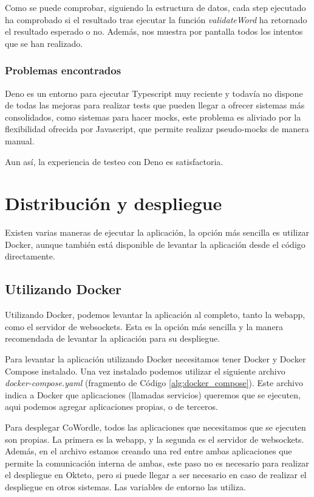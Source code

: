 Como se puede comprobar, siguiendo la estructura de datos, cada step ejecutado ha comprobado si el resultado tras ejecutar la función \textit{validateWord} ha retornado el resultado esperado o no. Además, nos muestra por pantalla todos los intentos que se han realizado.

\subsubsection{Problemas encontrados}
Deno es un entorno para ejecutar Typescript muy reciente y todavía no dispone de todas las mejoras para realizar tests que pueden llegar a ofrecer sistemas más consolidados, como sistemas para hacer mocks, este problema es aliviado por la flexibilidad ofrecida por Javascript, que permite realizar pseudo-mocks de manera manual.

Aun así, la experiencia de testeo con Deno es satisfactoria.

\section{Distribución y despliegue}

Existen varias maneras de ejecutar la aplicación, la opción más sencilla es utilizar Docker, aunque también está disponible de levantar la aplicación desde el código directamente.

\subsection{Utilizando Docker}
Utilizando Docker, podemos levantar la aplicación al completo, tanto la webapp, como el servidor de websockets. Esta es la opción más sencilla y la manera recomendada de levantar la aplicación para su despliegue.

Para levantar la aplicación utilizando Docker necesitamos tener Docker y Docker Compose instalado. Una vez instalado podemos utilizar el siguiente archivo \textit{docker-compose.yaml} (fragmento de Código \ref{alg:docker_compose}). Este archivo indica a Docker que aplicaciones (llamadas servicios) queremos que se ejecuten, aqui podemos agregar aplicaciones propias, o de terceros.

Para desplegar CoWordle, todos las aplicaciones que necesitamos que se ejecuten son propias. La primera es la webapp, y la segunda es el servidor de websockets. Además, en el archivo estamos creando una red entre ambas aplicaciones que permite la comunicación interna de ambas, este paso no es necesario para realizar el despliegue en Okteto, pero si puede llegar a ser necesario en caso de realizar el despliegue en otros sistemas. Las variables de entorno las utiliza.

